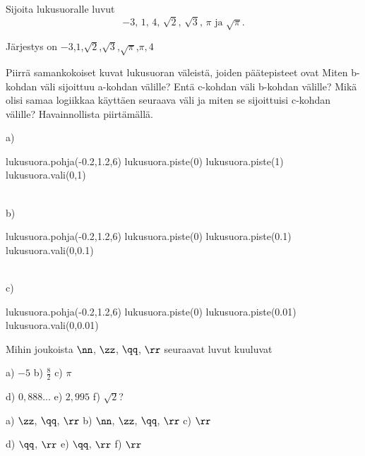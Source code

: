 \begin{tehtavasivu}

\begin{tehtava}%
Sijoita lukusuoralle luvut
\[
\mbox{$-3$, $1$, $4$, $\sqrt{2}$, $\sqrt{3}$, $\pi$ ja $\sqrt{\pi}$.}
\]
\begin{vastaus}
Järjestys on \mbox{$-3$,$1$,$\sqrt{2}$,$\sqrt{3}$,$\sqrt{\pi}$,$\pi,4$}
\end{vastaus}
\end{tehtava}

\begin{tehtava} %
Piirrä samankokoiset kuvat lukusuoran väleistä, joiden päätepisteet ovat 
Miten b-kohdan väli sijoittuu a-kohdan välille? Entä c-kohdan väli b-kohdan välille? Mikä olisi samaa logiikkaa käyttäen seuraava väli ja miten se sijoittuisi c-kohdan välille? Havainnollista piirtämällä.
\begin{vastaus}
a)
\begin{kuva}
	lukusuora.pohja(-0.2,1.2,6)
	lukusuora.piste(0)
	lukusuora.piste(1)
	lukusuora.vali(0,1)
\end{kuva}
\\
b) 
\begin{kuva}
	lukusuora.pohja(-0.2,1.2,6)
	lukusuora.piste(0)
	lukusuora.piste(0.1)
	lukusuora.vali(0,0.1)
\end{kuva}
\\
c) 
\begin{kuva}
	lukusuora.pohja(-0.2,1.2,6)
	lukusuora.piste(0)
	lukusuora.piste(0.01)
	lukusuora.vali(0,0.01)
\end{kuva}
\end{vastaus}
\end{tehtava}


\begin{tehtava}
Mihin joukoista $\nn$, $\zz$, $\qq$, $\rr$ seuraavat luvut kuuluvat

a) $-5$ \qquad b) $\frac82$ \qquad c) $\pi$

d) $0,888...$ \qquad e) $2,995$ \qquad f) $\sqrt{2}$?

\begin{vastaus}
a) $\zz$, $\qq$, $\rr$ \qquad b) $\nn$, $\zz$, $\qq$, $\rr$ \qquad c) $\rr$

d) $\qq$, $\rr$ \qquad e) $\qq$, $\rr$ \qquad f) $\rr$
\end{vastaus}
\end{tehtava}


\end{tehtavasivu}
